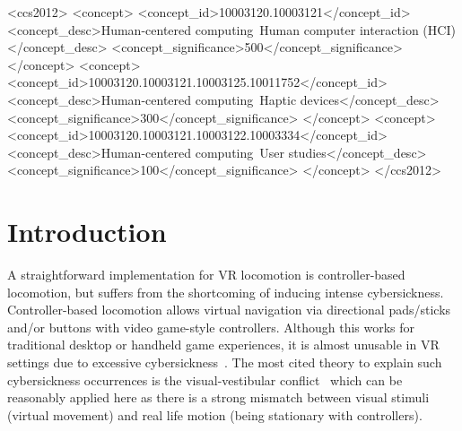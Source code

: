 \documentclass[manuscript,review,anonymous]{acmart}
\begin{document}
\begin{CCSXML}
<ccs2012>
<concept>
<concept_id>10003120.10003121</concept_id>
<concept_desc>Human-centered computing~Human computer interaction (HCI)</concept_desc>
<concept_significance>500</concept_significance>
</concept>
<concept>
<concept_id>10003120.10003121.10003125.10011752</concept_id>
<concept_desc>Human-centered computing~Haptic devices</concept_desc>
<concept_significance>300</concept_significance>
</concept>
<concept>
<concept_id>10003120.10003121.10003122.10003334</concept_id>
<concept_desc>Human-centered computing~User studies</concept_desc>
<concept_significance>100</concept_significance>
</concept>
</ccs2012>
\end{CCSXML}



\maketitle


\section{Introduction}



A straightforward implementation for VR locomotion is controller-based locomotion, but suffers from the shortcoming of inducing intense cybersickness. Controller-based locomotion allows virtual navigation via directional pads/sticks and/or buttons with video game-style controllers. Although this works for traditional desktop or handheld game experiences, it is almost unusable in VR settings due to excessive cybersickness~\cite{controllerCybersickness2014}. The most cited theory to explain such cybersickness occurrences is the visual-vestibular conflict~\cite{visualVestibularConflictVR2020} which can be reasonably applied here as there is a strong mismatch between visual stimuli (virtual movement) and real life motion (being stationary with controllers).
\end{document}
